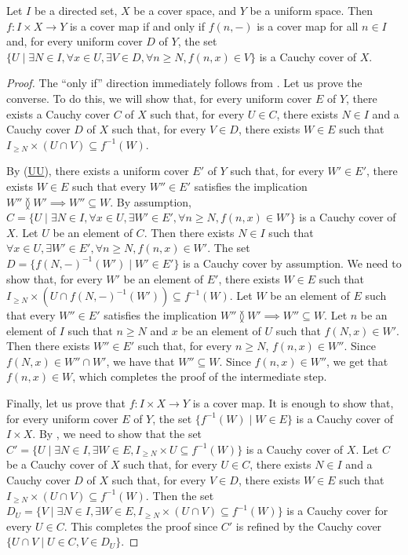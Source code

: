 \documentclass[reqno]{amsart}
\newcommand{\axref}[1]{(\hyperref[ax:#1]{#1})}
\theoremstyle{definition}
\theoremstyle{remark}
\numberwithin{figure}{section}
\newcommand{\overlap}[2]{#1 \between #2}
\begin{document}
\begin{prop}
Let $I$ be a directed set, $X$ be a cover space, and $Y$ be a uniform space.
Then $f : I \times X \to Y$ is a cover map if and only if $f(n,-)$ is a cover map for all $n \in I$ and, for every uniform cover $D$ of $Y$,
the set $\{ U \mid \exists N \in I, \forall x \in U, \exists V \in D, \forall n \geq N, f(n,x) \in V \}$ is a Cauchy cover of $X$.
\end{prop}
\begin{proof}
The ``only if'' direction immediately follows from .
Let us prove the converse.
To do this, we will show that, for every uniform cover $E$ of $Y$, there exists a Cauchy cover $C$ of $X$ such that, for every $U \in C$, there exists $N \in I$ and a Cauchy cover $D$ of $X$
such that, for every $V \in D$, there exists $W \in E$ such that $I_{\geq N} \times (U \cap V) \subseteq f^{-1}(W)$.

By \axref{UU}, there exists a uniform cover $E'$ of $Y$ such that, for every $W' \in E'$,
there exists $W \in E$ such that every $W'' \in E'$ satisfies the implication $\overlap{W''}{W'} \implies W'' \subseteq W$.
By assumption, $C = \{ U \mid \exists N \in I, \forall x \in U, \exists W' \in E', \forall n \geq N, f(n,x) \in W' \}$ is a Cauchy cover of $X$.
Let $U$ be an element of $C$.
Then there exists $N \in I$ such that $\forall x \in U, \exists W' \in E', \forall n \geq N, f(n,x) \in W'$.
The set $D = \{ f(N,-)^{-1}(W') \mid W' \in E' \}$ is a Cauchy cover by assumption.
We need to show that, for every $W'$ be an element of $E'$, there exists $W \in E$ such that $I_{\geq N} \times (U \cap f(N,-)^{-1}(W')) \subseteq f^{-1}(W)$.
Let $W$ be an element of $E$ such that every $W'' \in E'$ satisfies the implication $\overlap{W''}{W'} \implies W'' \subseteq W$.
Let $n$ be an element of $I$ such that $n \geq N$ and $x$ be an element of $U$ such that $f(N,x) \in W'$.
Then there exists $W'' \in E'$ such that, for every $n \geq N$, $f(n,x) \in W''$.
Since $f(N,x) \in W'' \cap W'$, we have that $W'' \subseteq W$.
Since $f(n,x) \in W''$, we get that $f(n,x) \in W$, which completes the proof of the intermediate step.

Finally, let us prove that $f : I \times X \to Y$ is a cover map.
It is enough to show that, for every uniform cover $E$ of $Y$, the set $\{ f^{-1}(W) \mid W \in E \}$ is a Cauchy cover of $I \times X$.
By , we need to show that the set $C' = \{ U \mid \exists N \in I, \exists W \in E, I_{\geq N} \times U \subseteq f^{-1}(W) \}$ is a Cauchy cover of $X$.
Let $C$ be a Cauchy cover of $X$ such that, for every $U \in C$, there exists $N \in I$ and a Cauchy cover $D$ of $X$
such that, for every $V \in D$, there exists $W \in E$ such that $I_{\geq N} \times (U \cap V) \subseteq f^{-1}(W)$.
Then the set $D_U = \{ V \mid \exists N \in I, \exists W \in E, I_{\geq N} \times (U \cap V) \subseteq f^{-1}(W) \}$ is a Cauchy cover for every $U \in C$.
This completes the proof since $C'$ is refined by the Cauchy cover $\{ U \cap V \mid U \in C, V \in D_U \}$.
\end{proof}
\end{document}
